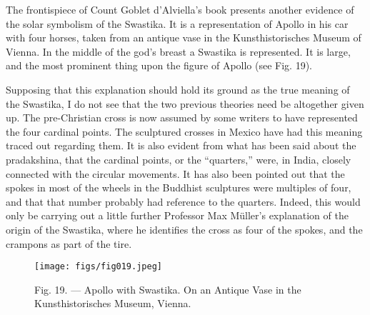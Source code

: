 \documentclass[a4paper, 11pt, oneside, polutonikogreek, english]{article}
\begin{document}
The frontispiece of Count Goblet d'Alviella's book presents another evidence of the solar symbolism of the Swastika. It is a representation of Apollo in his car with four horses, taken from an antique vase in the Kunsthistorisches Museum of Vienna. In the middle of the god's breast a Swastika is represented. It is large, and the most prominent thing upon the figure of Apollo (see Fig. 19).

Supposing that this explanation should hold its ground as the true meaning of the Swastika, I do not see that the two previous theories need be altogether given up. The pre-Christian cross is now assumed by some writers to have represented the four cardinal points. The sculptured crosses in Mexico have had this meaning traced out regarding them. It is also evident from what has been said about the pradakshina, that the cardinal points, or the ``quarters,'' were, in India, closely connected with the circular movements. It has also been pointed out that the spokes in most of the wheels in the Buddhist sculptures were multiples of four, and that that number probably had reference to the quarters. Indeed, this would only be carrying out a little further Professor Max Müller's explanation of the origin of the Swastika, where he identifies the cross as four of the spokes, and the crampons as part of the tire.

\begin{figure}[H]
\centering
\texttt{[image: figs/fig019.jpeg]}
\caption[Fig. 19. --- Apollo with Swastika.]{Fig. 19. --- Apollo with Swastika. On an Antique Vase in the Kunsthistorisches Museum, Vienna.}
\end{figure}
\end{document}
